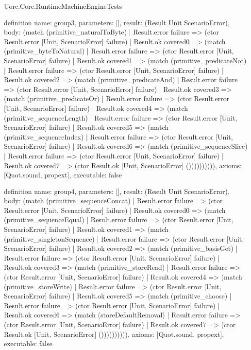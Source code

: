 \begin{lexlean}{Uorc.Core.RuntimeMachineEngineTests}
\begin{semanticmodule}
definition{
  name: group3,
  parameters: [],
  result: (Result Unit ScenarioError),
  body: (match (primitive_naturalToByte)
    | Result.error failure => (ctor Result.error [Unit, ScenarioError] failure)
    | Result.ok covered0 => (match (primitive_byteToNatural)
      | Result.error failure => (ctor Result.error [Unit, ScenarioError] failure)
      | Result.ok covered1 => (match (primitive_predicateNot)
        | Result.error failure => (ctor Result.error [Unit, ScenarioError] failure)
        | Result.ok covered2 => (match (primitive_predicateAnd)
          | Result.error failure => (ctor Result.error [Unit, ScenarioError] failure)
          | Result.ok covered3 => (match (primitive_predicateOr)
            | Result.error failure => (ctor Result.error [Unit, ScenarioError] failure)
            | Result.ok covered4 => (match (primitive_sequenceLength)
              | Result.error failure => (ctor Result.error [Unit, ScenarioError] failure)
              | Result.ok covered5 => (match (primitive_sequenceIndex)
                | Result.error failure => (ctor Result.error [Unit, ScenarioError] failure)
                | Result.ok covered6 => (match (primitive_sequenceSlice)
                  | Result.error failure => (ctor Result.error [Unit, ScenarioError] failure)
                  | Result.ok covered7 => (ctor Result.ok [Unit, ScenarioError] ()))))))))),
  axioms: [Quot.sound, propext],
  executable: false
}

definition{
  name: group4,
  parameters: [],
  result: (Result Unit ScenarioError),
  body: (match (primitive_sequenceConcat)
    | Result.error failure => (ctor Result.error [Unit, ScenarioError] failure)
    | Result.ok covered0 => (match (primitive_sequenceEqual)
      | Result.error failure => (ctor Result.error [Unit, ScenarioError] failure)
      | Result.ok covered1 => (match (primitive_singletonSequence)
        | Result.error failure => (ctor Result.error [Unit, ScenarioError] failure)
        | Result.ok covered2 => (match (primitive_basisGet)
          | Result.error failure => (ctor Result.error [Unit, ScenarioError] failure)
          | Result.ok covered3 => (match (primitive_storeRead)
            | Result.error failure => (ctor Result.error [Unit, ScenarioError] failure)
            | Result.ok covered4 => (match (primitive_storeWrite)
              | Result.error failure => (ctor Result.error [Unit, ScenarioError] failure)
              | Result.ok covered5 => (match (primitive_choose)
                | Result.error failure => (ctor Result.error [Unit, ScenarioError] failure)
                | Result.ok covered6 => (match (storeDefaultRemoval)
                  | Result.error failure => (ctor Result.error [Unit, ScenarioError] failure)
                  | Result.ok covered7 => (ctor Result.ok [Unit, ScenarioError] ()))))))))),
  axioms: [Quot.sound, propext],
  executable: false
}


\end{semanticmodule}
\end{lexlean}
